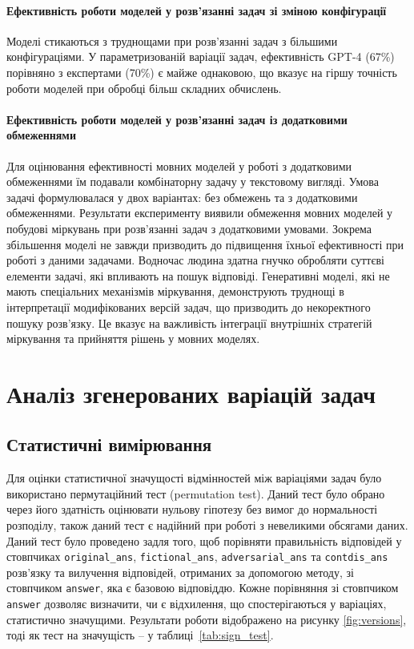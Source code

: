 \paragraph{Ефективність роботи моделей у розв'язанні задач зі зміною конфігурації}
Моделі стикаються з труднощами при розв'язанні задач з більшими конфігураціями. У параметризованій варіації задач, ефективність GPT-4 (67\%) порівняно з експертами (70\%) є майже однаковою, що вказує на гіршу точність роботи моделей при обробці більш складних обчислень.

\paragraph{Ефективність роботи моделей у розв'язанні задач із додатковими обмеженнями}
Для оцінювання ефективності мовних моделей у роботі з додатковими обмеженнями їм подавали комбінаторну задачу у текстовому вигляді. Умова задачі формулювалася у двох варіантах: без обмежень та з додатковими обмеженнями.
Результати експерименту виявили обмеження мовних моделей у побудові міркувань при розв’язанні задач з додатковими умовами. Зокрема збільшення моделі не завжди призводить до підвищення їхньої ефективності при роботі з даними задачами. Водночас людина здатна гнучко обробляти суттєві елементи задачі, які впливають на пошук відповіді.
Генеративні моделі, які не мають спеціальних механізмів міркування, демонструють труднощі в інтерпретації модифікованих версій задач, що призводить до некоректного пошуку розв’язку. Це вказує на важливість інтеграції внутрішніх стратегій міркування та прийняття рішень у мовних моделях.


\section{Аналіз згенерованих варіацій задач}

\subsection{Статистичні вимірювання}

Для оцінки статистичної значущості відмінностей між варіаціями задач було використано пермутаційний тест (permutation test). Даний тест було обрано через його здатність оцінювати нульову гіпотезу без вимог до нормальності розподілу, також даний тест є надійний при роботі з невеликими обсягами даних. Даний тест було проведено задля того, щоб порівняти правильність відповідей у стовпчиках \texttt{original\_ans}, \texttt{fictional\_ans}, \texttt{adversarial\_ans} та \texttt{contdis\_ans} розв'язку та вилучення відповідей, отриманих за допомогою методу, зі стовпчиком \texttt{answer}, яка є базовою відповіддю. Кожне порівняння зі стовпчиком \texttt{answer} дозволяє визначити, чи є відхилення, що спостерігаються у варіаціях, статистично значущими. Результати роботи відображено на рисунку \ref{fig:versions}, тоді як тест на значущість -- у таблиці~\ref{tab:sign_test}.

